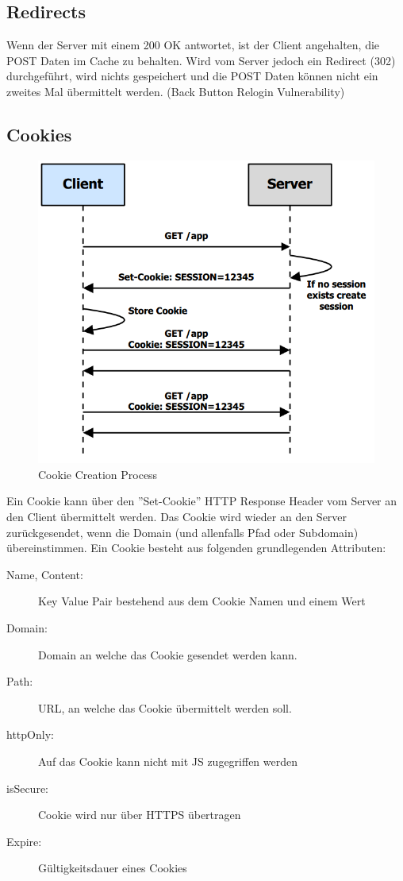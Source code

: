 \subsection{Redirects}
Wenn der Server mit einem 200 OK antwortet, ist der Client angehalten, die POST Daten im Cache zu behalten. Wird vom Server jedoch ein Redirect (302) durchgeführt, wird nichts gespeichert und die POST Daten können nicht ein zweites Mal übermittelt werden. (Back Button Relogin Vulnerability)

\subsection{Cookies}
\begin{figure}[h!]
	\centering
	\includegraphics[width=0.6\linewidth]{images/cookie_creation_process}
	\caption{Cookie Creation Process}
	\label{fig:cookiecreationprocess}
\end{figure}

Ein Cookie kann über den ''Set-Cookie'' HTTP Response Header vom Server an den Client übermittelt werden. Das Cookie wird wieder an den Server zurückgesendet, wenn die Domain (und allenfalls Pfad oder Subdomain) übereinstimmen. Ein Cookie besteht aus folgenden grundlegenden Attributen:
\begin{description}
	\item[Name, Content:] Key Value Pair bestehend aus dem Cookie Namen und einem Wert
	\item[Domain:] Domain an welche das Cookie gesendet werden kann.
	\item[Path:] URL, an welche das Cookie übermittelt werden soll.
	\item[httpOnly:] Auf das Cookie kann nicht mit JS zugegriffen werden
	\item[isSecure:] Cookie wird nur über HTTPS übertragen
	\item[Expire:] Gültigkeitsdauer eines Cookies
\end{description}

